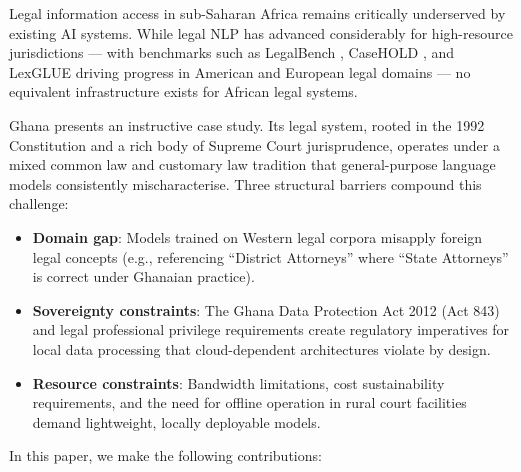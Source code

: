 \documentclass[11pt]{article}
\begin{document}
Legal information access in sub-Saharan Africa remains critically
underserved by existing AI systems. While legal NLP has advanced
considerably for high-resource jurisdictions --- with benchmarks such as
LegalBench \cite{guha2023legalbench}, CaseHOLD \cite{zheng2021casehold},
and LexGLUE \cite{chalkidis2022lexglue} driving progress in American and
European legal domains --- no equivalent infrastructure exists for African
legal systems.

Ghana presents an instructive case study. Its legal system, rooted in the
1992 Constitution and a rich body of Supreme Court jurisprudence, operates
under a mixed common law and customary law tradition that general-purpose
language models consistently mischaracterise. Three structural barriers
compound this challenge:

\begin{itemize}
    \item \textbf{Domain gap}: Models trained on Western legal corpora
    misapply foreign legal concepts (e.g., referencing ``District Attorneys''
    where ``State Attorneys'' is correct under Ghanaian practice).

    \item \textbf{Sovereignty constraints}: The Ghana Data Protection Act
    2012 (Act 843) and legal professional privilege requirements create
    regulatory imperatives for local data processing that cloud-dependent
    architectures violate by design.

    \item \textbf{Resource constraints}: Bandwidth limitations, cost
    sustainability requirements, and the need for offline operation in
    rural court facilities demand lightweight, locally deployable models.
\end{itemize}


In this paper, we make the following contributions:
\end{document}
